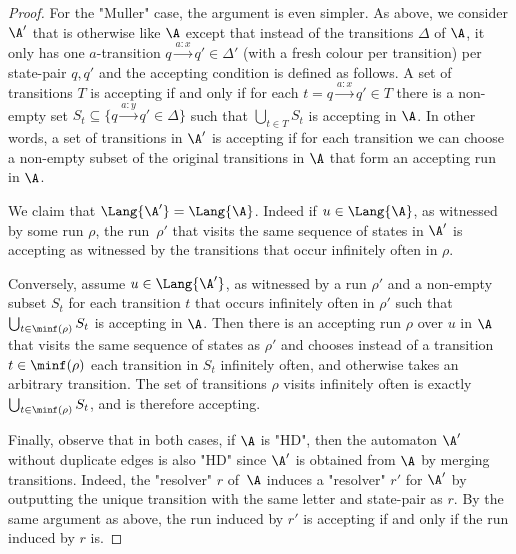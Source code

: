 \documentclass[10pt,a4paper]{amsart}
\begin{document}
\begin{proof}
	For the "Muller" case, the argument is even simpler. As above, we consider $\A'$ that is otherwise like $\A$ except that instead of the transitions $\Delta$ of $\A$, it only has one $a$-transition $q\xrightarrow{a:x}q'\in \Delta'$ (with a fresh colour per transition) per state-pair $q,q'$ and the accepting condition is defined as follows. A set of  transitions $T$ is accepting if and only if for each $t=q\xrightarrow{a:x}q'\in T$ there is a non-empty set $S_t \subseteq \{ q\xrightarrow{a:y}q'\in \Delta\}$ such that $\bigcup_{t\in T} S_t$ is accepting in $\A$. In other words, a set of transitions in $\A'$ is accepting if for each transition we can choose a non-empty subset of the original transitions in $\A$ that form an accepting run in $\A$.
	
	We claim that $\Lang{\A'}=\Lang{\A}$. Indeed if $u\in \Lang{\A}$, as witnessed by some run $\rho$, the run~$\rho'$ that visits the same sequence of states in $\A'$ is accepting as witnessed by the transitions that occur infinitely often in $\rho$.
	
	Conversely, assume $u\in \Lang{\A'}$, as witnessed by a run $\rho'$ and a non-empty subset $S_t$ for each transition $t$ that occurs infinitely often in $\rho'$ such that $\bigcup_{t\in \minf(\rho)} S_t$ is accepting in $\A$. Then there is an accepting run $\rho$ over $u$ in $\A$ that visits the same sequence of states as $\rho'$ and chooses instead of a transition $t\in \minf(\rho)$ each transition in $S_t$ infinitely often, and otherwise takes an arbitrary transition. The set of transitions $\rho$ visits infinitely often is exactly $\bigcup_{t\in\minf(\rho)} S_t$, and is therefore accepting.
	
	Finally, observe that in both cases, if $\A$ is "HD", then the automaton $\A'$ without duplicate edges is also "HD" since $\A'$ is obtained from $\A$ by merging transitions. Indeed, the "resolver" $r$ of~$\A$ induces a "resolver" $r'$ for $\A'$ by outputting the unique transition with the same letter and state-pair as $r$. By the same argument as above, the run induced by $r'$ is accepting if and only if the run induced by $r$ is.
\end{proof}
\end{document}
